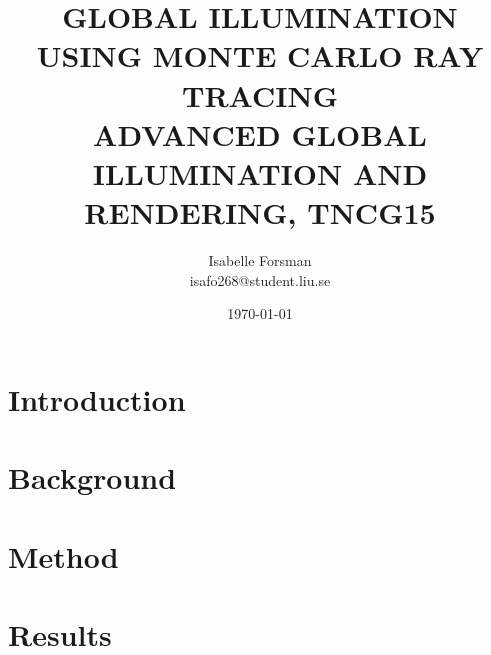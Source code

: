 \documentclass[twocolumn]{article}
\title{GLOBAL ILLUMINATION USING MONTE CARLO RAY TRACING \\ {\small\vspace{-1.0em} ADVANCED GLOBAL ILLUMINATION AND RENDERING, TNCG15}}
\author{Isabelle Forsman\\isafo268@student.liu.se}
\date{\today}
\begin{document}
\maketitle

\begin{abstract}

\end{abstract}


\section{Introduction}

\section{Background}

\section{Method}

\section{Results}


\newpage
\printbibliography
\end{document}
